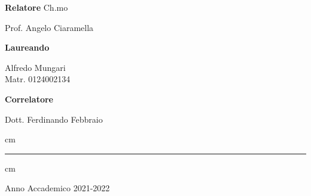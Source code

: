 \documentclass[12pt,italian,a4paper,oneside,openright]{book}
\begin{document}
    \vskip 1.0cm

    \large
    \begin{minipage}[t]{7cm}
        \textbf{Relatore}
        Ch.mo 

        Prof. Angelo Ciaramella\\

    \end{minipage}
    \hfill
    \begin{minipage}[t]{5cm}
        \textbf{Laureando}

        Alfredo Mungari\\
        Matr. 0124002134
    \end{minipage}

    \large
    \begin{minipage}[t]{7cm}
        \textbf{Correlatore}

        Dott. Ferdinando Febbraio\\

    \end{minipage}

     cm

    \hrule
     cm \Large \centerline {Anno Accademico 2021-2022}
    \vfill \eject

    \pagestyle{plain}

    \tableofcontents

    \listoffigures

    \listoftables

    
    
    
    
    

    \printbibliography
\end{document}
